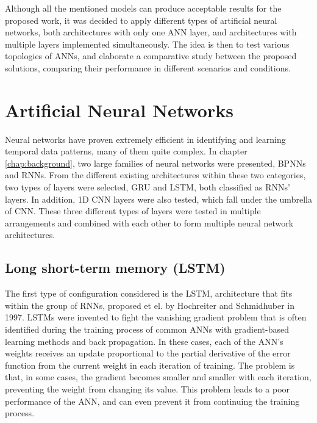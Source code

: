 Although all the mentioned models can produce acceptable results for the proposed work, it was decided to apply different types of artificial neural networks, both architectures with only one \ac{ANN} layer, and architectures with multiple layers implemented simultaneously. The idea is then to test various topologies of \ac{ANN}s, and elaborate a comparative study between the proposed solutions, comparing their performance in different scenarios and conditions.



\section{Artificial Neural Networks}\label{sec:layers}

Neural networks have proven extremely efficient in identifying and learning temporal data patterns, many of them quite complex. In chapter \ref{chap:background}, two large families of neural networks were presented, \ac{BPNN}s and \ac{RNN}s. From the different existing architectures within these two categories, two types of layers were selected, \ac{GRU} and \ac{LSTM}, both classified as \ac{RNN}s' layers. In addition, \ac{1D CNN} layers were also tested, which fall under the umbrella of \ac{CNN}. These three different types of layers were tested in multiple arrangements and combined with each other to form multiple neural network architectures.


\subsection{Long short-term memory (LSTM)}

The first type of configuration considered is the \ac{LSTM}, architecture that fits within the group of \ac{RNN}s, proposed et el. \cite{lstm0} by Hochreiter and Schmidhuber in 1997.
\ac{LSTM}s were invented to fight the vanishing gradient problem that is often identified during the training process of common \ac{ANN}s with gradient-based learning methods and back propagation. In these cases, each of the \ac{ANN}'s weights receives an update proportional to the partial derivative of the error function from the current weight in each iteration of training. The problem is that, in some cases, the gradient becomes smaller and smaller with each iteration, preventing the weight from changing its value. This problem leads to a poor performance of the \ac{ANN}, and can even prevent it from continuing the training process.

